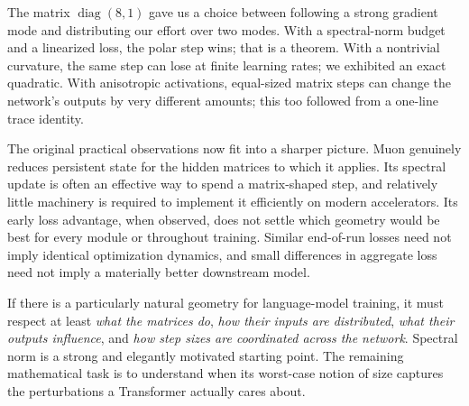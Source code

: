 The matrix \(\operatorname{diag}(8,1)\) gave us a choice between following a strong gradient mode and distributing our effort over two modes.  With a spectral-norm budget and a linearized loss, the polar step wins; that is a theorem.  With a nontrivial curvature, the same step can lose at finite learning rates; we exhibited an exact quadratic.  With anisotropic activations, equal-sized matrix steps can change the network's outputs by very different amounts; this too followed from a one-line trace identity.

The original practical observations now fit into a sharper picture.  Muon genuinely reduces persistent state for the hidden matrices to which it applies.  Its spectral update is often an effective way to spend a matrix-shaped step, and relatively little machinery is required to implement it efficiently on modern accelerators.  Its early loss advantage, when observed, does not settle which geometry would be best for every module or throughout training.  Similar end-of-run losses need not imply identical optimization dynamics, and small differences in aggregate loss need not imply a materially better downstream model.

If there is a particularly natural geometry for language-model training, it must respect at least \emph{what the matrices do}, \emph{how their inputs are distributed}, \emph{what their outputs influence}, and \emph{how step sizes are coordinated across the network}.  Spectral norm is a strong and elegantly motivated starting point.  The remaining mathematical task is to understand when its worst-case notion of size captures the perturbations a Transformer actually cares about.
